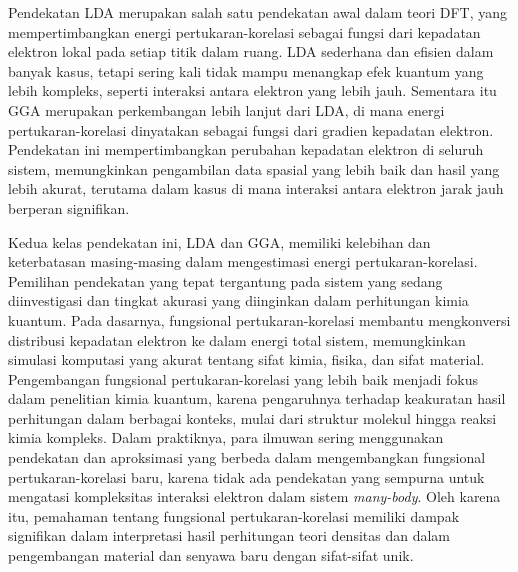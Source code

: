 Pendekatan LDA merupakan salah satu pendekatan awal dalam teori DFT, yang mempertimbangkan energi pertukaran-korelasi sebagai fungsi dari kepadatan elektron lokal pada setiap titik dalam ruang. LDA sederhana dan efisien dalam banyak kasus, tetapi sering kali tidak mampu menangkap efek kuantum yang lebih kompleks, seperti interaksi antara elektron yang lebih jauh. Sementara itu GGA merupakan perkembangan lebih lanjut dari LDA, di mana energi pertukaran-korelasi dinyatakan sebagai fungsi dari gradien kepadatan elektron. Pendekatan ini mempertimbangkan perubahan kepadatan elektron di seluruh sistem, memungkinkan pengambilan data spasial yang lebih baik dan hasil yang lebih akurat, terutama dalam kasus di mana interaksi antara elektron jarak jauh berperan signifikan.

Kedua kelas pendekatan ini, LDA dan GGA, memiliki kelebihan dan keterbatasan masing-masing dalam mengestimasi energi pertukaran-korelasi. Pemilihan pendekatan yang tepat tergantung pada sistem yang sedang diinvestigasi dan tingkat akurasi yang diinginkan dalam perhitungan kimia kuantum. Pada dasarnya, fungsional pertukaran-korelasi membantu mengkonversi distribusi kepadatan elektron ke dalam energi total sistem, memungkinkan simulasi komputasi yang akurat tentang sifat kimia, fisika, dan sifat material. Pengembangan fungsional pertukaran-korelasi yang lebih baik menjadi fokus dalam penelitian kimia kuantum, karena pengaruhnya terhadap keakuratan hasil perhitungan dalam berbagai konteks, mulai dari struktur molekul hingga reaksi kimia kompleks.
Dalam praktiknya, para ilmuwan sering menggunakan pendekatan dan aproksimasi yang berbeda dalam mengembangkan fungsional pertukaran-korelasi baru, karena tidak ada pendekatan yang sempurna untuk mengatasi kompleksitas interaksi elektron dalam sistem \textit{many-body}. Oleh karena itu, pemahaman tentang fungsional pertukaran-korelasi memiliki dampak signifikan dalam interpretasi hasil perhitungan teori densitas dan dalam pengembangan material dan senyawa baru dengan sifat-sifat unik.

